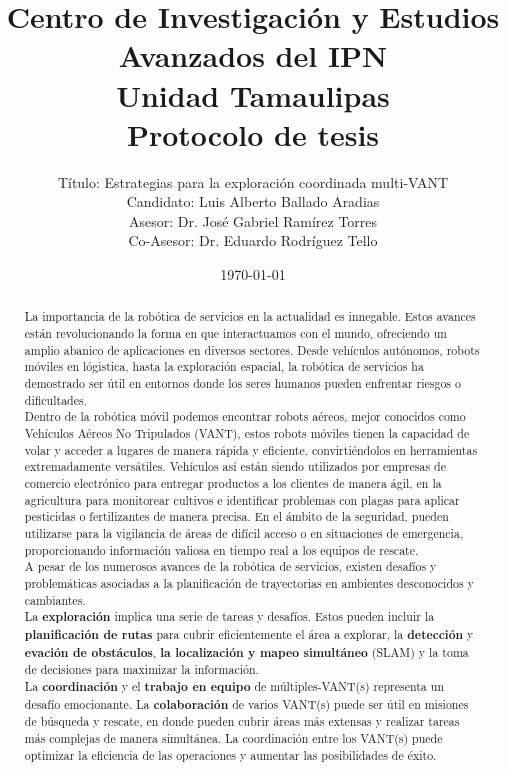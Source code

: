 \documentclass[11pt,epsf,times]{article}
\title{ Centro de Investigaci\'{o}n y Estudios Avanzados del IPN\\
  Unidad Tamaulipas\\
  \textbf{Protocolo de tesis}
}
\author{
Título: Estrategias para la exploración coordinada multi-VANT \\
Candidato: Luis Alberto Ballado Aradias \\
Asesor: Dr. José Gabriel Ramírez Torres \\
Co-Asesor: Dr. Eduardo Rodríguez Tello
}
\date{\today}
\begin{document}
\maketitle

\begin{abstract}

  La importancia de la robótica de servicios en la actualidad es innegable. Estos avances están revolucionando la forma en que interactuamos con el mundo, ofreciendo un amplio abanico de aplicaciones en diversos sectores. Desde vehículos autónomos, robots móviles en lógistica, hasta la exploración espacial, la robótica de servicios ha demostrado ser útil en entornos donde los seres humanos pueden enfrentar riesgos o dificultades.\\
  
  Dentro de la robótica móvil podemos encontrar robots aéreos, mejor conocidos como Vehículos Aéreos No Tripulados (VANT), estos robots móviles tienen la capacidad de volar y acceder a lugares de manera rápida y eficiente, convirtiéndolos en herramientas extremadamente versátiles. Vehículos así están siendo utilizados por empresas de comercio electrónico para entregar productos a los clientes de manera ágil, en la agricultura para monitorear cultivos e identificar problemas con plagas para aplicar pesticidas o fertilizantes de manera precisa. En el ámbito de la seguridad, pueden utilizarse para la vigilancia de áreas de difícil acceso o en situaciones de emergencia, proporcionando información valiosa en tiempo real a los equipos de rescate.\\

  A pesar de los numerosos avances de la robótica de servicios, existen desafíos y problemáticas asociadas a la planificación de trayectorias en ambientes desconocidos y cambiantes.\\
  La \textbf{exploración} implica una serie de tareas y desafíos. Estos pueden incluir la \textbf{planificación de rutas} para cubrir eficientemente el área a explorar, la \textbf{detección} y \textbf{evación de obstáculos}, \textbf{la localización y mapeo simultáneo} (SLAM) y la toma de decisiones para maximizar la información.\\

  La \textbf{coordinación} y el \textbf{trabajo en equipo} de múltiples-VANT(s) representa un desafío emocionante. La \textbf{colaboración} de varios VANT(s) puede ser útil en misiones de búsqueda y rescate, en donde pueden cubrir áreas más extensas y realizar tareas más complejas de manera simultánea. La coordinación entre los VANT(s) puede optimizar la eficiencia de las operaciones y aumentar las posibilidades de éxito.\\


\end{abstract}
\end{document}
